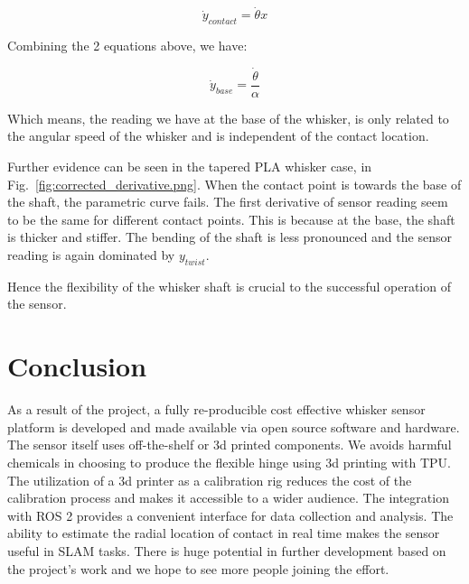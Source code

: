 \documentclass{report}
\begin{document}
    \[\dot{y}_{contact} = \dot{\theta}x\]

Combining the 2 equations above, we have:

    \[\dot{y}_{base} = \frac{\dot{\theta}}{\alpha} \]

Which means, the reading we have at the base of the whisker, is only related to the angular speed of the whisker and is independent of the contact location.

Further evidence can be seen in the tapered PLA whisker case, in Fig.~\ref*{fig:corrected_derivative.png}. When the contact point is towards the base of the shaft, the parametric curve fails. The first derivative of sensor reading seem to be the same for different contact points. This is because at the base, the shaft is thicker and stiffer. The bending of the shaft is less pronounced and the sensor reading is again dominated by \({y}_{twist}\).

Hence the flexibility of the whisker shaft is crucial to the successful operation of the sensor.


\section{Conclusion}

As a result of the project, a fully re-producible cost effective whisker sensor platform is developed and made available via open source software and hardware. The sensor itself uses off-the-shelf or 3d printed components. We avoids harmful chemicals in choosing to produce the flexible hinge using 3d printing with TPU. The utilization of a 3d printer as a calibration rig reduces the cost of the calibration process and makes it accessible to a wider audience. The integration with ROS 2 provides a convenient interface for data collection and analysis. The ability to estimate the radial location of contact in real time makes the sensor useful in SLAM tasks. There is huge potential in further development based on the project's work and we hope to see more people joining the effort.


\printbibliography
\end{document}
